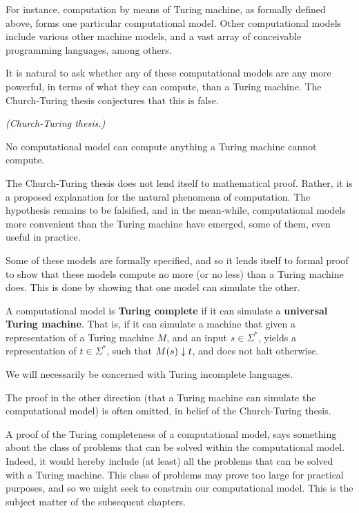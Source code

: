 For instance, computation by means of Turing machine, as formally defined
above, forms one particular computational model. Other computational models
include various other machine models, and a vast array of conceivable
programming languages, among others.

It is natural to ask whether any of these computational models are any more
powerful, in terms of what they can compute, than a Turing machine. The
Church-Turing thesis conjectures that this is false.

\begin{hypothesis} \textit{(Church-Turing thesis.)}

No computational model can compute anything a Turing machine cannot compute.

\end{hypothesis}

The Church-Turing thesis does not lend itself to mathematical proof. Rather, it
is a proposed explanation for the natural phenomena of computation. The
hypothesis remains to be falsified, and in the mean-while, computational models
more convenient than the Turing machine have emerged, some of them, even useful
in practice.

Some of these models are formally specified, and so it lends itself to formal
proof to show that these models compute no more (or no less) than a Turing
machine does. This is done by showing that one model can simulate the other.

\begin{definition} A computational model is \textbf{Turing complete} if it can
simulate a \textbf{universal Turing machine}. That is, if it can simulate a
machine that given a representation of a Turing machine $M$, and an input $s
\in \Sigma^*$, yields a representation of $t \in \Sigma^*$, such that
$M\mathopen{}\left({s}\right)\mathclose{}\downarrow t$, and does not halt otherwise. \end{definition}

\begin{remark} We will necessarily be concerned with Turing incomplete
languages. \end{remark}

The proof in the other direction (that a Turing machine can simulate the
computational model) is often omitted, in belief of the Church-Turing thesis.

A proof of the Turing completeness of a computational model, says something
about the class of problems that can be solved within the computational model.
Indeed, it would hereby include (at least) all the problems that can be solved
with a Turing machine. This class of problems may prove too large for practical
purposes, and so we might seek to constrain our computational model.  This is
the subject matter of the subsequent chapters.

